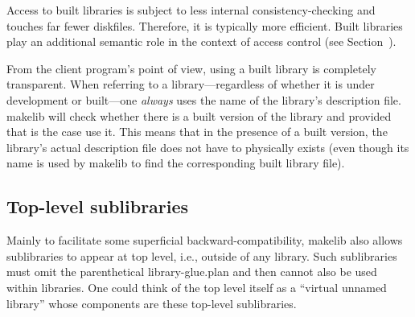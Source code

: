 Access to built libraries is subject to less internal
consistency-checking and touches far fewer diskfiles.
Therefore, it is typically more efficient.  Built libraries
play an additional semantic role in the context of access control (see
Section~).

From the client program's point of view, using a built library is
completely transparent.  When referring to a library---regardless of
whether it is under development or built---one {\em always} uses the
name of the library's description file.  makelib will check whether there
is a built version of the library and provided that is the case use
it.  This means that in the presence of a built version, the
library's actual description file does not have to physically exists
(even though its name is used by makelib to find the corresponding built
library file).

\subsection{Top-level sublibraries}

Mainly to facilitate some superficial backward-compatibility, makelib also
allows sublibraries to appear at top level, i.e., outside of any library.
Such sublibraries must omit the parenthetical library-glue.plan and then
cannot also be used within libraries. One could think of the top level
itself as a ``virtual unnamed library'' whose components are these
top-level sublibraries.

